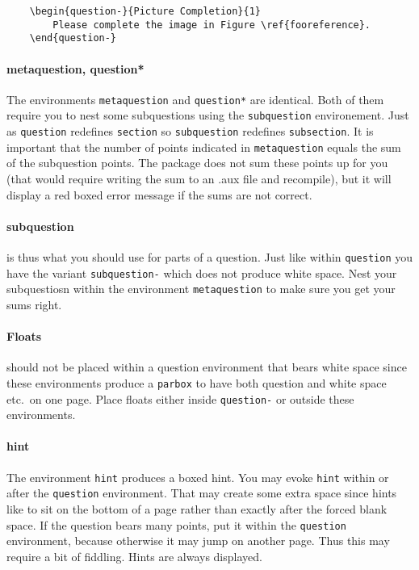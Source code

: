 \documentclass[a4paper]{scrartcl}
\begin{document}
\begin{verbatim}
    \begin{question-}{Picture Completion}{1}
        Please complete the image in Figure \ref{fooreference}.
    \end{question-}
\end{verbatim}


\paragraph{metaquestion, question*}

The environments \verb|metaquestion| and \verb|question*| are identical. Both of them require you to nest some subquestions using the \verb|subquestion| environement. Just as \verb|question| redefines \verb|section| so \verb|subquestion| redefines \verb|subsection|. It is important that the number of points indicated in  \verb|metaquestion| equals the sum of the subquestion points. The package does not sum these points up for you (that would require writing the sum to an .aux file and recompile), but it will display a red boxed error message if the sums are not correct.

\paragraph{subquestion} is thus what you should use for parts of a question. Just like within \verb|question| you have the variant \verb|subquestion-| which does not produce white space. Nest your subquestiosn within the environment \verb|metaquestion|  to make sure you get your sums right.

\paragraph{Floats} should not be placed within a question environment that bears white space since these environments produce a \verb|parbox| to have both question and white space etc.\ on one page. Place floats either inside \verb|question-| or outside these environments. 

\paragraph{hint}

The environment \verb|hint| produces a boxed hint. You may evoke \verb|hint| within or after the \verb|question| environment. That may create some extra space since hints like to sit on the bottom of a page rather than exactly after the forced blank space. If the question bears many points, put it within the \verb|question| environment, because otherwise it may jump on another page. Thus this may require a bit of fiddling. Hints are always displayed.
\end{document}
